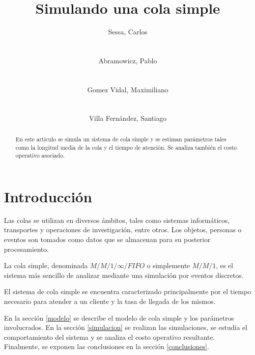 \documentclass{sig-alternate}
\begin{document}
\title{Simulando una cola simple}


\author{
    \alignauthor
    Sessa, Carlos\\
     \\
    \ \\
    Abramowicz, Pablo\\
     \\
    \ \\
    \alignauthor
    Gomez Vidal, Maximiliano\\
     \\
    \ \\
    Villa Fern\'{a}ndez, Santiago\\
}

\maketitle

\begin{abstract}
En este art\'{i}culo se simula un sistema de cola simple y se estiman
par\'{a}metros tales como la longitud media de la cola y el tiempo de
atenci\'{o}n. Se analiza tambi\'{e}n el costo operativo asociado.
\end{abstract}


\section{Introducci\'{o}n}\label{introduccion}

Las colas se utilizan en diversos \'{a}mbitos, tales como sistemas 
inform\'{a}ticos, transportes y operaciones de investigaci\'{o}n, entre otros. 
Los objetos, personas o eventos son tomados 
como datos que se almacenan para su posterior procesamiento.


La cola simple, denominada $M/M/1/\infty/FIFO$ o simplemente $M/M/1$, es el 
sistema m\'{a}s sencillo de analizar mediante una simulaci\'{o}n por eventos 
discretos.


El sistema de cola simple se encuentra caracterizado principalmente por el 
tiempo necesario para atender a un cliente y la tasa de llegada de los mismos.


En la secci\'{o}n \ref{modelo} se describe el modelo de cola simple y los
par\'{a}metros involucrados. En la secci\'{o}n \ref{simulacion} se realizan
las simulaciones, se estudia el comportamiento del sistema y se analiza
el costo operativo resultante. Finalmente, se exponen las conclusiones en 
la secci\'{o}n \ref{conclusiones}.
\end{document}
